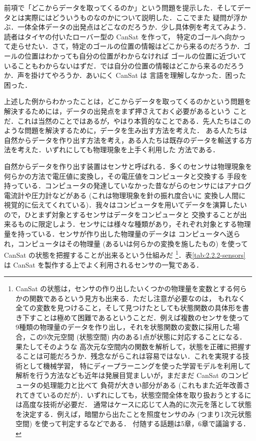 \documentclass[dvipdfmx]{jsarticle}
\begin{document}
前項で「どこからデータを取ってくるのか」という問題を提示した．そしてデータとは実際にはどういうものなのかについて説明した．ここでまた
疑問が浮かぶ．一体全体データの出発点はどこなのだろうか．少し具体例を考えてみよう．読者はタイヤの付いたローバー型の CanSat を作って，
特定のゴールへ向かって走らせたい．さて，特定のゴールの位置の情報はどこから来るのだろうか．ゴールの位置はわかっても自分の位置がわからなければ
ゴールの位置に近づいていることもわからないはずだ．では自分の位置の情報はどこから来るのだろうか．声を掛けてやろうか．あいにく CanSat は
言語を理解しなかった．困った困った．

上述した例からわかったことは，どこからデータを取ってくるのかという問題を解決するためには，データの出発点をまず押さえておく必要があるという
ことだ．これは当然のことではあるが，やはり本質的なことである．先人たちはこのような問題を解決するために，データを生み出す方法を考えた．
ある人たちは自然からデータを作り出す方法を考え，ある人たちは既存のデータを輸送する方法を考えた．いずれにしても物理現象を上手く利用した
方法である．

自然からデータを作り出す装置はセンサと呼ばれる．多くのセンサは物理現象を何らかの方法で電圧値に変換し，その電圧値をコンピュータと交換する
手段を持っている．コンピュータの発達していなかった昔ながらのセンサにはアナログ電流計や圧力計などがある (これは物理現象を針の振れ度合いに
変換し人間に視覚的に伝えてくれている)．我々はコンピュータを用いてデータを演算したいので，ひとまず対象とするセンサはデータをコンピュータと
交換することが出来るものに限定しよう．センサには様々な種類があり，それぞれ対象とする物理量を持っている．センサが作り出した物理量のデータは
コンピュータへ送られ，コンピュータはその物理量 (あるいは何らかの変換を施したもの) を使って CanSat の状態を把握することが出来るという仕組みだ
\footnote{CanSat の状態は，センサの作り出したいくつかの物理量を変数とする何らかの関数であるという見方も出来る．ただし注意が必要なのは，
もれなく全ての変数を見つけること，そして見つけたとしても状態関数の具体形を書き下すことは極めて困難であるということだ．例えば複数のセンサを使って
9種類の物理量のデータを作り出し，それを状態関数の変数に採用した場合，この9次元空間 (状態空間) 内のある1点が状態に対応することになる．果たしてそのような
高次元な空間内の関数を解析して，状態を正確に把握することは可能だろうか．残念ながらこれは容易ではない．これを実現する技術として機械学習，
特にディープラーニングを使った学習モデルを利用して解析を行う方法なども近年は発展目覚ましいが，まだまだ CanSat のコンピュータの処理能力と比べて
負荷が大きい部分がある (これもまた近年改善されてきているのだが)．いずれにしても，状態空間全体を取り扱おうとするには高度な技術が必要だ．
通常はケースに応じて人為的に次元を落として状態を決定する．例えば，暗闇から出たことを照度センサのみ (つまり1次元状態空間) を使って判定するなどである．
付随する話題は5章，6章で議論する．}．表\ref{tab:2.2.2-sensors}は CanSat を製作する上でよく利用されるセンサの一覧である．
\end{document}

